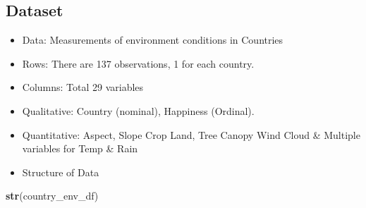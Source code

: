 \documentclass[]{article}
\newenvironment{Shaded}{\begin{snugshade}}{\end{snugshade}}
\newcommand{\KeywordTok}[1]{\textcolor[rgb]{0.13,0.29,0.53}{\textbf{#1}}}
\newcommand{\NormalTok}[1]{#1}
\begin{document}
\hypertarget{dataset}{%
\subsection{Dataset}\label{dataset}}

\begin{itemize}
\item
  Data: Measurements of environment conditions in Countries
\item
  Rows: There are 137 observations, 1 for each country.
\item
  Columns: Total 29 variables
\item
  Qualitative: Country (nominal), Happiness (Ordinal).
\item
  Quantitative: Aspect, Slope Crop Land, Tree Canopy Wind Cloud \&
  Multiple variables for Temp \& Rain
\item
  Structure of Data
\end{itemize}

\begin{Shaded}
\begin{Highlighting}[]
\KeywordTok{str}\NormalTok{(country_env_df)}
\end{Highlighting}
\end{Shaded}
\end{document}
